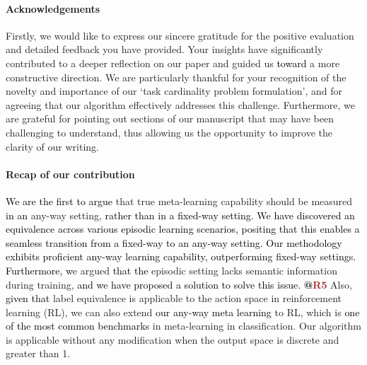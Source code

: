 \documentclass[letterpaper]{article} %
\newcommand{\nj}[1]{\textcolor{black}{#1}}
\newcommand{\yr}[1]{\textcolor{black}{#1}}
\newcommand{\rrr}[1]{\textcolor{olive}{#1}}
\newcommand{\rrrr}[1]{\textcolor{purple}{#1}}
\newcommand{\rrrrr}[1]{\textcolor{brown}{#1}}
\begin{document}
\paragraph{Acknowledgements}
Firstly, we would like to express our sincere gratitude for the positive evaluation and detailed feedback you have provided. Your insights have significantly contributed to a deeper reflection on our paper and guided us \nj{toward} a more constructive direction. We are particularly thankful for your recognition of the novelty and importance of our `task cardinality problem formulation', and for agreeing that our algorithm effectively addresses this challenge. 
Furthermore, we are grateful for pointing out sections of our manuscript that may have been challenging to understand, thus allowing us the opportunity to improve the clarity of our writing.

\paragraph{Recap of our contribution} 
\nj{We are the first to argue} that true meta-learning capability should be measured \nj{in an} any-way setting, \yr{rather than} \nj{in a fixed-way setting}. 
\yr{We have discovered an equivalence across various episodic learning scenarios, positing that this enables a seamless transition from a fixed-way to an any-way setting. Our methodology exhibits proficient any-way learning capability, outperforming fixed-way settings.}
\yr{Furthermore, w}e argued \nj{that the} episodic setting lacks semantic information during training, \yr{\nj{and we have proposed} a solution to solve this issue.} %
\textbf{@\rrrrr{R5}} Also, \yr{given that} label equivalence is applicable to the action space in reinforcement learning (RL), we can also extend \nj{our any-way meta learning} to RL, which is \nj{one of the most common benchmarks} in meta-learning in classification. Our algorithm is applicable without any modification when the output space is discrete and greater than 1. 
\end{document}
